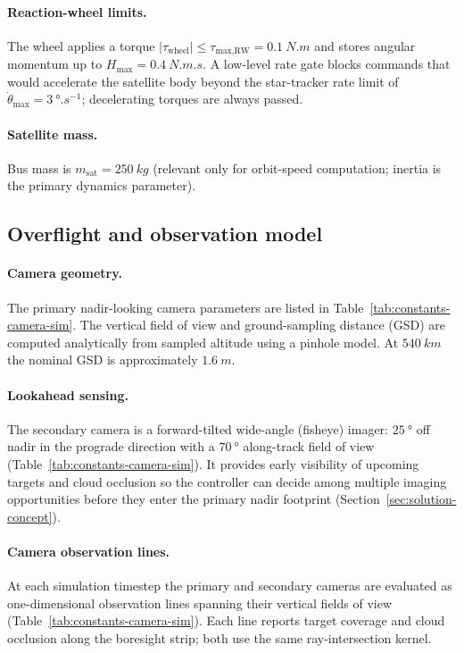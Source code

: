 \paragraph{Reaction-wheel limits.}
The wheel applies a torque $|\tau_\text{wheel}|\le\tau_\text{max,RW}=\SI{0.1}{N.m}$ and
stores angular momentum up to $H_\text{max}=\SI{0.4}{N.m.s}$.
A low-level rate gate blocks commands that would accelerate the satellite body beyond the star-tracker rate limit of $\dot\theta_\text{max}=\SI{3}{\degree.s^{-1}}$; decelerating torques are always passed.

\paragraph{Satellite mass.}
Bus mass is $m_\text{sat}=\SI{250}{kg}$ (relevant only for orbit-speed computation; inertia is the primary dynamics parameter).

\subsection{Overflight and observation model}
\label{sec:obs-model}

\paragraph{Camera geometry.}
The primary nadir-looking camera parameters are listed in Table~\ref{tab:constants-camera-sim}.
The vertical field of view and ground-sampling distance (GSD) are computed analytically from sampled altitude using a pinhole model.
At $\SI{540}{km}$ the nominal GSD is approximately $\SI{1.6}{m}$.

\paragraph{Lookahead sensing.}
The secondary camera is a forward-tilted wide-angle (fisheye) imager: $\SI{25}{\degree}$ off nadir in the prograde direction with a $\SI{70}{\degree}$ along-track field of view
(Table~\ref{tab:constants-camera-sim}).
It provides early visibility of upcoming targets and cloud occlusion so the controller can decide among multiple imaging opportunities before they enter the primary nadir footprint (Section~\ref{sec:solution-concept}).

\paragraph{Camera observation lines.}
At each simulation timestep the primary and secondary cameras are evaluated as one-dimensional observation lines spanning their vertical fields of view (Table~\ref{tab:constants-camera-sim}).
Each line reports target coverage and cloud occlusion along the boresight strip; both use the same ray-intersection kernel.

